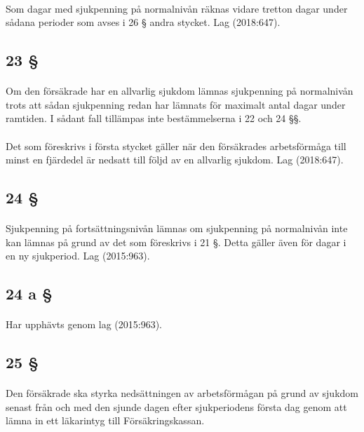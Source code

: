 \documentclass[a4paper,notitlepage,openany,10pt]{book}
\begin{document}
\paragraph*{}
Som dagar med sjukpenning på normalnivån räknas vidare tretton dagar under sådana perioder som avses i 26 § andra stycket.
Lag (2018:647).
\subsection*{23 §}
\paragraph*{}
Om den försäkrade har en allvarlig sjukdom lämnas sjukpenning på normalnivån trots att sådan sjukpenning redan har lämnats för maximalt antal dagar under ramtiden. I sådant fall tillämpas inte bestämmelserna i 22 och 24 §§.
\paragraph*{}
Det som föreskrivs i första stycket gäller när den försäkrades arbetsförmåga till minst en fjärdedel är nedsatt till följd av en allvarlig sjukdom.
Lag (2018:647).
\subsection*{24 §}
\paragraph*{}
Sjukpenning på fortsättningsnivån lämnas om sjukpenning på normalnivån inte kan lämnas på grund av det som föreskrivs i 21 §. Detta gäller även för dagar i en ny sjukperiod.
Lag (2015:963).
\subsection*{24 a §}
\paragraph*{}
Har upphävts genom
lag (2015:963).
\subsection*{25 §}
\paragraph*{}
Den försäkrade ska styrka nedsättningen av arbetsförmågan på grund av sjukdom senast från och med den sjunde dagen efter sjukperiodens första dag genom att lämna in ett läkarintyg till Försäkringskassan.
\end{document}
